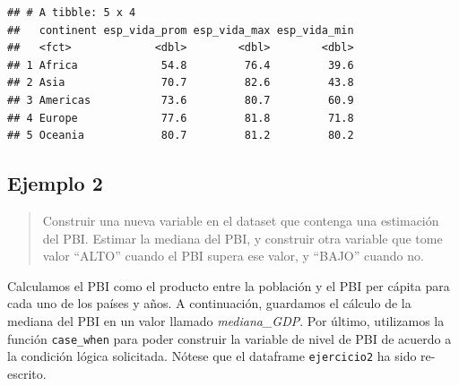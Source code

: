 \documentclass[]{book}
\newenvironment{Shaded}{\begin{snugshade}}{\end{snugshade}}
\newcommand{\DataTypeTok}[1]{\textcolor[rgb]{0.13,0.29,0.53}{#1}}
\newcommand{\KeywordTok}[1]{\textcolor[rgb]{0.13,0.29,0.53}{\textbf{#1}}}
\newcommand{\NormalTok}[1]{#1}
\newcommand{\OperatorTok}[1]{\textcolor[rgb]{0.81,0.36,0.00}{\textbf{#1}}}
\newcommand{\StringTok}[1]{\textcolor[rgb]{0.31,0.60,0.02}{#1}}
\begin{document}
\begin{verbatim}
## # A tibble: 5 x 4
##   continent esp_vida_prom esp_vida_max esp_vida_min
##   <fct>             <dbl>        <dbl>        <dbl>
## 1 Africa             54.8         76.4         39.6
## 2 Asia               70.7         82.6         43.8
## 3 Americas           73.6         80.7         60.9
## 4 Europe             77.6         81.8         71.8
## 5 Oceania            80.7         81.2         80.2
\end{verbatim}

\hypertarget{ejemplo-2}{%
\subsection{Ejemplo 2}\label{ejemplo-2}}

\begin{quote}
Construir una nueva variable en el dataset que contenga una estimación del PBI. Estimar la mediana del PBI, y construir otra variable que tome valor ``ALTO'' cuando el PBI supera ese valor, y ``BAJO'' cuando no.
\end{quote}

Calculamos el PBI como el producto entre la población y el PBI per cápita para cada uno de los países y años. A continuación, guardamos el cálculo de la mediana del PBI en un valor llamado \emph{mediana\_GDP}. Por último, utilizamos la función \texttt{case\_when} para poder construir la variable de nivel de PBI de acuerdo a la condición lógica solicitada. Nótese que el dataframe \texttt{ejercicio2} ha sido re-escrito.

\begin{Shaded}
\end{Shaded}
\end{document}
